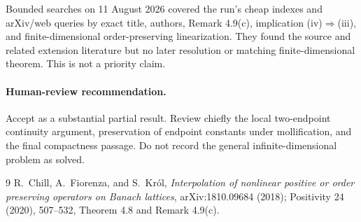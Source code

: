 \documentclass[11pt]{article}
\begin{document}
Bounded searches on 11 August 2026 covered the run's cheap indexes and
arXiv/web queries by exact title, authors, Remark 4.9(c), implication
(iv)$\Rightarrow$(iii), and finite-dimensional order-preserving
linearization.  They found the source and related extension literature but
no later resolution or matching finite-dimensional theorem.  This is not a
priority claim.

\paragraph{Human-review recommendation.}
Accept as a substantial partial result.  Review chiefly the local
two-endpoint continuity argument, preservation of endpoint constants under
mollification, and the final compactness passage.  Do not record the general
infinite-dimensional problem as solved.

\begin{thebibliography}{9}
R.~Chill, A.~Fiorenza, and S.~Kr\'ol,
\emph{Interpolation of nonlinear positive or order preserving operators on
Banach lattices}, arXiv:1810.09684 (2018); Positivity 24 (2020), 507--532,
Theorem 4.8 and Remark 4.9(c).
\end{thebibliography}
\end{document}
